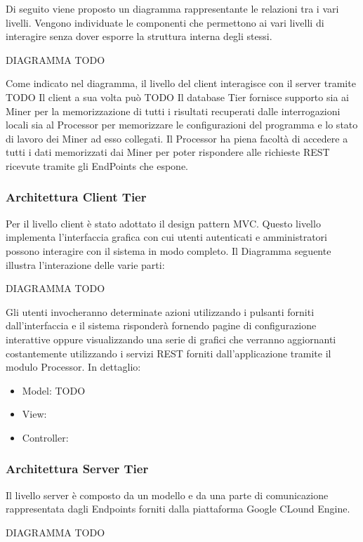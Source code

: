 Di seguito viene proposto un diagramma rappresentante le relazioni tra i vari livelli.
Vengono individuate le componenti che permettono ai vari livelli di interagire senza dover
esporre la struttura interna degli stessi.

DIAGRAMMA TODO

Come indicato nel diagramma, il livello del client interagisce con il server tramite 
TODO
Il client a sua volta può
TODO
Il database Tier fornisce supporto sia ai Miner per la memorizzazione di tutti i risultati recuperati dalle interrogazioni locali sia al Processor per memorizzare le configurazioni del programma e lo stato di lavoro dei Miner ad esso collegati.
Il Processor ha piena facoltà di accedere a tutti i dati memorizzati dai Miner per poter rispondere alle richieste REST ricevute tramite gli EndPoints che espone.


\subsubsection{Architettura Client Tier}
Per il livello client è stato adottato il design pattern MVC. Questo livello implementa l'interfaccia grafica con cui utenti autenticati e amministratori possono interagire con il sistema in modo completo. Il Diagramma seguente illustra l'interazione delle varie parti:

DIAGRAMMA TODO


Gli utenti invocheranno determinate azioni utilizzando i pulsanti forniti dall'interfaccia e il sistema risponderà fornendo pagine di configurazione interattive oppure visualizzando una serie di grafici che verranno aggiornanti costantemente utilizzando i servizi REST forniti dall'applicazione tramite il modulo Processor. In dettaglio:

\begin{itemize}
\item Model: TODO
\item View: 
\item Controller: 
\end{itemize}

\subsubsection{Architettura Server Tier}
Il livello server è composto da un modello e da una parte di comunicazione rappresentata dagli Endpoints forniti dalla piattaforma Google CLound Engine.

DIAGRAMMA TODO

